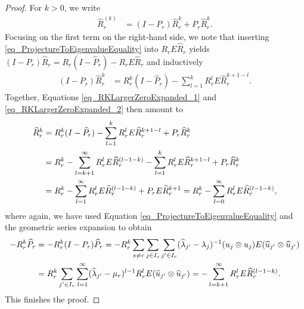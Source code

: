 \documentclass[10pt,a4paper]{amsart}
\begin{document}
\begin{proof}
  For \( k > 0 \), we write
  \begin{align}
    \label{eq_RKLargerZeroExpanded_1}
        \widehat{R}_{r}^{ (k) } 
    & = 
        ( I - P_{r} ) \widehat{R}_{r}^{k} + P_{r} \widehat{R}_{r}^{k}.
  \end{align}
  Focusing on the first term on the right-hand side, we note that inserting \eqref{eq_ProjectureToEigenvalueEquality} into \( R_{r} E \widehat{R}_{r} \) yields \( ( I - P_{r} ) \widehat{R}_{r} = R_{r} ( I - \widehat{P}_{r} ) - R_{r} E \widehat{R}_{r} \)
  and inductively
  \begin{align}
    \label{eq_RKLargerZeroExpanded_2}
            ( I - P_{r} ) \widehat{R}_{r}^{k} 
    & = 
            R_{r}^{k} ( I - \widehat{P}_{r} ) 
          - 
            \sum_{ l = 1 }^{k} 
            R_{r}^{l} E \widehat{R}_{r}^{k + 1 - l}.
  \end{align}
  Together, Equations \eqref{eq_RKLargerZeroExpanded_1} and
                      \eqref{eq_RKLargerZeroExpanded_2} then amount to
  \begin{align}
            \widehat{R}_{r}^{k} 
    & = 
            R_{r}^{k} ( I - \widehat{P}_{r} ) 
          - 
            \sum_{ l = 1 }^{k} 
            R_{r}^{l} E \widehat{R}_{r}^{k + 1 - l}
          + 
            P_{r} \widehat{R}_{r}^{k}
    \\
    & = 
            R_{r}^{k} 
          - 
            \sum_{ l = k + 1 }^{ \infty } 
            R_{r}^{l} E \widehat{R}_{r}^{(l - 1 - k)} 
          - 
            \sum_{ l = 1 }^{k} 
            R_{r}^{l} E \widehat{R}_{r}^{k + 1 - l}
          + 
            P_{r} \widehat{R}_{r}^{k}
    \notag
    \\
    & = 
    \notag
        R_{r}^{k} 
      - 
        \sum_{ l = 1 }^{ \infty } 
        R_{r}^{l} E \widehat{R}_{r}^{ (l - 1 - k) } 
      + 
        P_{r} E \widehat{R}_{r}^{k + 1}
    = 
        R_{r}^{k} 
      - 
        \sum_{l = 0}^{ \infty } 
        R_{r}^{l} E \widehat{R}_{r}^{ (l - 1 - k) },
  \end{align}
  where again, we have used Equation \eqref{eq_ProjectureToEigenvalueEquality}
  and the geometric series expansion to obtain
  \begin{align}
        - R_{r}^{k} \widehat{P}_{r} 
    & = 
        - R_{r}^{k} ( I - P_{r} ) \widehat{P}_{r} 
    = 
        - R_{r}^{k} 
          \sum_{ s \ne r } 
          \sum_{ j  \in I_{s} }
          \sum_{ j' \in I_{r} } 
          ( \widehat{ \lambda }_{j'} - \lambda_{j} )^{-1} 
          ( u_{j} \otimes u_{j} ) E 
          ( \widehat{u}_{j'} \otimes \widehat{u}_{j'}) 
    \\
    & = 
          R_{r}^{k}
          \sum_{ j' \in I_{r} } 
          \sum_{ l = 1 }^{ \infty } 
          ( \widehat{ \lambda }_{ j' } - \mu_{r} )^{ l - 1 } R_{r}^{l}
          E ( \widehat{u}_{ j' } \otimes \widehat{u}_{ j' }) 
    = 
        - \sum_{ l = k + 1 }^{ \infty } 
          R_{r}^{l} E \widehat{R}_{r}^{ ( l - 1 - k ) }.
    \notag
  \end{align}
  This finishes the proof.
\end{proof}%
\end{document}
